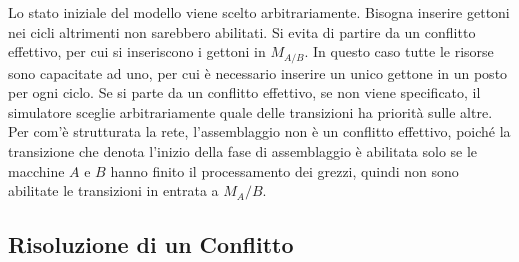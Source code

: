 \documentclass{article}
\numberwithin{equation}{subsection}
\begin{document}
\begin{center}
\end{center}

Lo stato iniziale del modello viene scelto arbitrariamente. Bisogna inserire gettoni nei cicli altrimenti non sarebbero abilitati. Si evita di partire da un conflitto 
effettivo, per cui si inseriscono i gettoni in $M_{A/B}$. In questo caso tutte le risorse sono capacitate ad uno, per cui è necessario inserire un unico gettone in un 
posto per ogni ciclo. Se si parte da un conflitto effettivo, se non viene specificato, il simulatore sceglie arbitrariamente quale delle transizioni ha priorità sulle 
altre. Per com'è strutturata la rete, l'assemblaggio non è un conflitto effettivo, poiché la transizione che denota l'inizio della fase di assemblaggio è abilitata solo se 
le macchine $A$ e $B$ hanno finito il processamento dei grezzi, quindi non sono abilitate le transizioni in entrata a $M_A/B$. 

\subsection{Risoluzione di un Conflitto}
\end{document}
